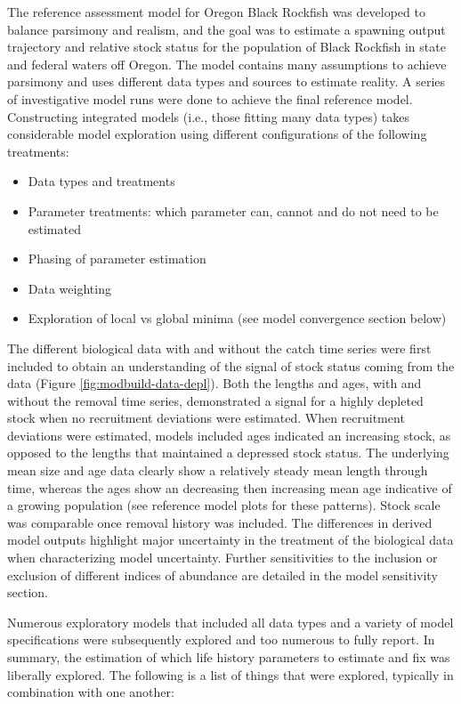 \documentclass[11pt,
  letterpaper,
]{article}
\providecommand{\tightlist}{%
  \setlength{\itemsep}{0pt}\setlength{\parskip}{0pt}}
\providecommand{\tightlist}{%
  \setlength{\itemsep}{0pt}\setlength{\parskip}{0pt}}
\begin{document}
The reference assessment model for Oregon Black Rockfish was developed to balance parsimony and realism, and the goal was to estimate a spawning output trajectory and relative stock status for the population of Black Rockfish in state and federal waters off Oregon. The model contains many assumptions to achieve parsimony and uses different data types and sources to estimate reality. A series of investigative model runs were done to achieve the final reference model. Constructing integrated models (i.e., those fitting many data types) takes considerable model exploration using different configurations of the following treatments:

\begin{itemize}
\tightlist
\item
  Data types and treatments
\item
  Parameter treatments: which parameter can, cannot and do not need to be estimated
\item
  Phasing of parameter estimation
\item
  Data weighting
\item
  Exploration of local vs global minima (see model convergence section below)
\end{itemize}

The different biological data with and without the catch time series were first included to obtain an understanding of the signal of stock status coming from the data (Figure \ref{fig:modbuild-data-depl}). Both the lengths and ages, with and without the removal time series, demonstrated a signal for a highly depleted stock when no recruitment deviations were estimated. When recruitment deviations were estimated, models included ages indicated an increasing stock, as opposed to the lengths that maintained a depressed stock status. The underlying mean size and age data clearly show a relatively steady mean length through time, whereas the ages show an decreasing then increasing mean age indicative of a growing population (see reference model plots for these patterns). Stock scale was comparable once removal history was included. The differences in derived model outputs highlight major uncertainty in the treatment of the biological data when characterizing model uncertainty. Further sensitivities to the inclusion or exclusion of different indices of abundance are detailed in the model sensitivity section.

Numerous exploratory models that included all data types and a variety of model specifications were subsequently explored and too numerous to fully report. In summary, the estimation of which life history parameters to estimate and fix was liberally explored. The following is a list of things that were explored, typically in combination with one another:
\end{document}
